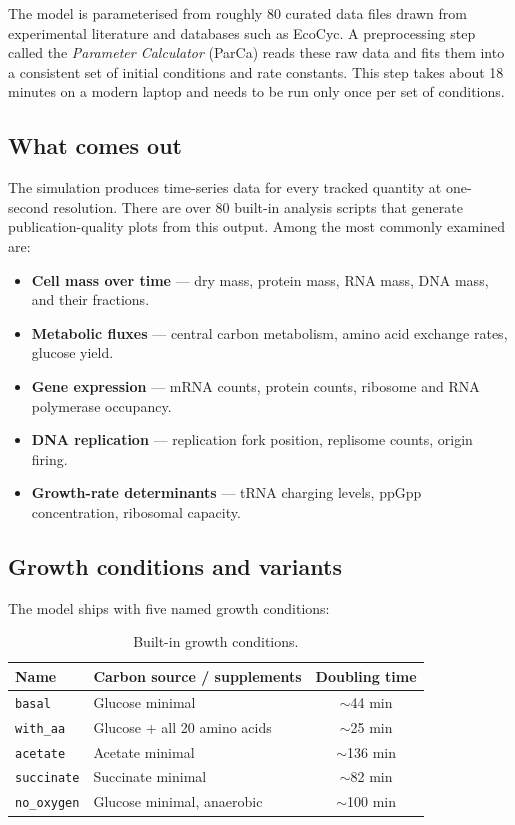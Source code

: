 \documentclass[11pt,a4paper]{article}
\begin{document}
The model is parameterised from roughly 80 curated data files drawn from
experimental literature and databases such as EcoCyc.  A preprocessing step
called the \emph{Parameter Calculator} (ParCa) reads these raw data and fits
them into a consistent set of initial conditions and rate constants.  This
step takes about 18 minutes on a modern laptop and needs to be run only once
per set of conditions.

\subsection{What comes out}

The simulation produces time-series data for every tracked quantity at
one-second resolution.  There are over 80 built-in analysis scripts that
generate publication-quality plots from this output.  Among the most commonly
examined are:

\begin{itemize}[nosep]
  \item \textbf{Cell mass over time} --- dry mass, protein mass, RNA mass,
        DNA mass, and their fractions.
  \item \textbf{Metabolic fluxes} --- central carbon metabolism, amino acid
        exchange rates, glucose yield.
  \item \textbf{Gene expression} --- mRNA counts, protein counts, ribosome
        and RNA polymerase occupancy.
  \item \textbf{DNA replication} --- replication fork position, replisome
        counts, origin firing.
  \item \textbf{Growth-rate determinants} --- tRNA charging levels, ppGpp
        concentration, ribosomal capacity.
\end{itemize}

\subsection{Growth conditions and variants}

The model ships with five named growth conditions:

\begin{table}[H]
\centering
\caption{Built-in growth conditions.}
\begin{tabular}{llc}
  \toprule
  \textbf{Name} & \textbf{Carbon source / supplements} & \textbf{Doubling time} \\
  \midrule
  \texttt{basal}       & Glucose minimal                & $\sim$44 min \\
  \texttt{with\_aa}    & Glucose + all 20 amino acids   & $\sim$25 min \\
  \texttt{acetate}     & Acetate minimal                & $\sim$136 min \\
  \texttt{succinate}   & Succinate minimal              & $\sim$82 min \\
  \texttt{no\_oxygen}  & Glucose minimal, anaerobic     & $\sim$100 min \\
  \bottomrule
\end{tabular}
\end{table}
\end{document}
